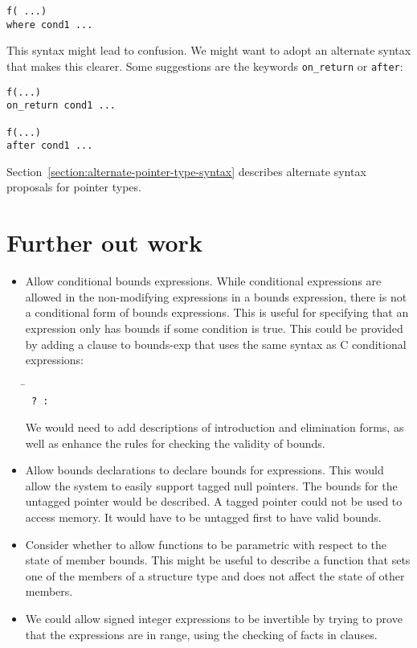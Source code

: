 \begin{verbatim}
f( ...)
where cond1 ...
\end{verbatim}

This syntax might lead to confusion. We might want to adopt an alternate
syntax that makes this clearer. Some suggestions are the keywords
\texttt{on\_return} or \texttt{after}:

\begin{verbatim}
f(...)
on_return cond1 ...

f(...)
after cond1 ...
\end{verbatim}

Section~\ref{section:alternate-pointer-type-syntax} describes alternate
syntax proposals for pointer types.

\section{Further out work}
\begin{itemize}
\item Allow conditional bounds expressions.   While conditional
expressions are allowed in the non-modifying expressions in a bounds expression, 
there is not a conditional form of bounds expressions.  This is useful for
specifying that an expression only has bounds if some condition is true.
This could be provided by adding a clause to bounds-exp that uses the
same syntax as C conditional expressions:
\begin{tabbing}
\= \\
\>\texttt{ ?  : }
\end{tabbing}

We would need to add descriptions of introduction and elimination
forms, as well as enhance the rules for checking the validity of bounds.

\item Allow bounds declarations to declare bounds for expressions.
This would allow the system to easily support tagged null pointers.
The bounds for the untagged pointer would be described. 
A tagged pointer could not be used to access memory.  It would have to be
untagged first  to have valid bounds.

\item Consider whether to allow functions to be
parametric with respect to the state of member bounds. This might be
useful to describe a function that sets one of the members of a
structure type and does not affect the state of other members.

\item We could allow signed integer expressions to be invertible
by trying to prove that the expressions are in range, using the
checking of facts in  clauses.
\end{itemize}


